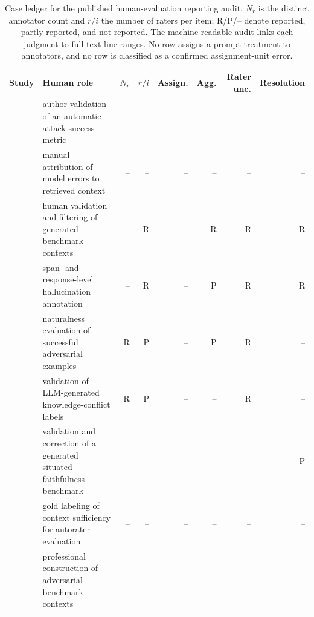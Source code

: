 \begin{table}[t]
\centering\scriptsize
\setlength{\tabcolsep}{3pt}
\begin{tabularx}{\linewidth}{l>{\raggedright\arraybackslash}Xrrrrrr}
\toprule
Study & Human role & $N_r$ & $r/i$ & Assign. & Agg. & Rater unc. & Resolution \\
\midrule
\citet{poisonedRAG2024} & author validation of an automatic attack-success metric & -- & -- & -- & -- & -- & -- \\
\citet{irrelevantContext2023} & manual attribution of model errors to retrieved context & -- & -- & -- & -- & -- & -- \\
\citet{rrag040} & human validation and filtering of generated benchmark contexts & -- & R & -- & R & R & R \\
\citet{ragTruth2024} & span- and response-level hallucination annotation & -- & R & -- & P & R & R \\
\citet{rrag096} & naturalness evaluation of successful adversarial examples & R & P & -- & P & R & -- \\
\citet{rrag024} & validation of LLM-generated knowledge-conflict labels & R & P & -- & -- & R & -- \\
\citet{rrag038} & validation and correction of a generated situated-faithfulness benchmark & -- & -- & -- & -- & -- & P \\
\citet{sufficientContext2024} & gold labeling of context sufficiency for autorater evaluation & -- & -- & -- & -- & -- & -- \\
\citet{rrag019} & professional construction of adversarial benchmark contexts & -- & -- & -- & -- & -- & -- \\
\bottomrule
\end{tabularx}
\caption{Case ledger for the published human-evaluation reporting audit. $N_r$ is the distinct annotator count and $r/i$ the number of raters per item; R/P/-- denote reported, partly reported, and not reported. The machine-readable audit links each judgment to full-text line ranges. No row assigns a prompt treatment to annotators, and no row is classified as a confirmed assignment-unit error.}
\label{tab:published-human-evaluation-cases}
\end{table}
